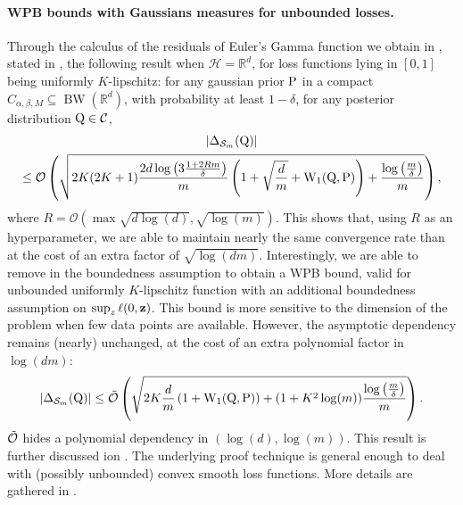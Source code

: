 \paragraph{WPB bounds with Gaussians measures for unbounded losses.} Through the calculus of the residuals of Euler's Gamma function we obtain in , stated in , the following result when $\mathcal{H}=\mathbb{R}^d$, for loss functions lying in $[0,1]$ being uniformly $K$-lipschitz: for any gaussian prior $\P$ in a compact $C_{\alpha,\beta,M}\subseteq \operatorname{BW}(\mathbb{R}^d)$, with probability at least $1-\delta$, for any posterior distribution $\Q\in \mathcal{C}$,
\begin{multline*} 
    |\Delta_{\Sm}(\Q)| \\ 
    \leq \mathcal{O}\left(\sqrt{2K(2K+1)\frac{2d\log\left(3\frac{1 +2Rm }{\delta}\right)}{m} \left(1+ \sqrt{\frac{d}{m}} + \W_{1}(\Q,\P)  \right) +\frac{\log\left( \frac{m}{\delta} \right)}{m}} \right), 
\end{multline*}
where $R= \mathcal{O}(\max \sqrt{d\log(d)},\sqrt{\log(m)})$.
This shows that, using $R$ as an hyperparameter, we are able to maintain nearly the same convergence rate than  at the cost of an extra factor of $\sqrt{\log(dm)}$.
Interestingly, we are able to remove in  the boundedness assumption to obtain a WPB bound, valid for unbounded uniformly $K$-lipschitz function  with an additional boundedness assumption on $\sup_{z} \ell(0,\z)$. This bound is more sensitive to the dimension of the problem when few data points are available. However, the asymptotic dependency remains (nearly) unchanged, at the cost of an extra polynomial factor in $\log(dm)$:
\begin{align}
|\Delta_{\Sm}(\Q)|  \leq\Tilde{\mathcal{O}}\left( \sqrt{2K\frac{d}{m}\left(1 + \W_{1}(\Q,\P)\right)+(1+K^2\log(m))\frac{\log\left( \frac{m}{\delta} \right)}{m}}   \right).
\end{align}
$\Tilde{\mathcal{O}}$ hides a polynomial dependency in $(\log(d),\log(m))$. This result is further discussed ion . The underlying proof technique is general enough to deal with (possibly unbounded) convex smooth loss functions. More details are gathered in .

